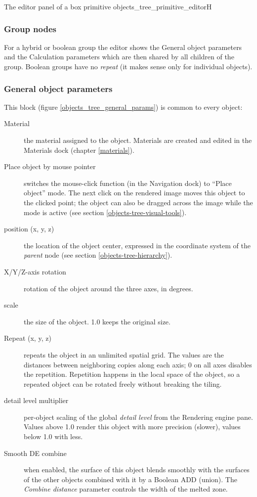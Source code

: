 {The editor panel of a box primitive}
{objects_tree_primitive_editor}{H}

\subsubsection{Group nodes}

For a hybrid or boolean group the editor shows the General object parameters and the Calculation
parameters which are then shared by all children of the group. Boolean groups have no
\emph{repeat} (it makes sense only for individual objects).

\subsubsection{General object parameters}\label{objects-tree-general-params}

This block (figure \ref{objects_tree_general_params}) is common to every object:

\begin{description}
	\item[Material] the material assigned to the object. Materials are created and edited in the
	Materials dock (chapter \ref{materials}).
	\item[Place object by mouse pointer] switches the mouse-click function (in the Navigation dock)
	to ``Place object'' mode. The next click on the rendered image moves this object to the clicked
	point; the object can also be dragged across the image while the mode is active
	(see section \ref{objects-tree-visual-tools}).
	\item[position (x, y, z)] the location of the object center, expressed in the coordinate system
	of the \emph{parent} node (see section \ref{objects-tree-hierarchy}).
	\item[X/Y/Z-axis rotation] rotation of the object around the three axes, in degrees.
	\item[scale] the size of the object. 1.0 keeps the original size.
	\item[Repeat (x, y, z)] repeats the object in an unlimited spatial grid. The values are the
	distances between neighboring copies along each axis; 0 on all axes disables the repetition.
	Repetition happens in the local space of the object, so a repeated object can be rotated
	freely without breaking the tiling.
	\item[detail level multiplier] per-object scaling of the global \emph{detail level} from the
	Rendering engine pane. Values above 1.0 render this object with more precision (slower),
	values below 1.0 with less.
	\item[Smooth DE combine] when enabled, the surface of this object blends smoothly with the
	surfaces of the other objects combined with it by a Boolean ADD (union). The
	\emph{Combine distance} parameter controls the width of the melted zone.
\end{description}

